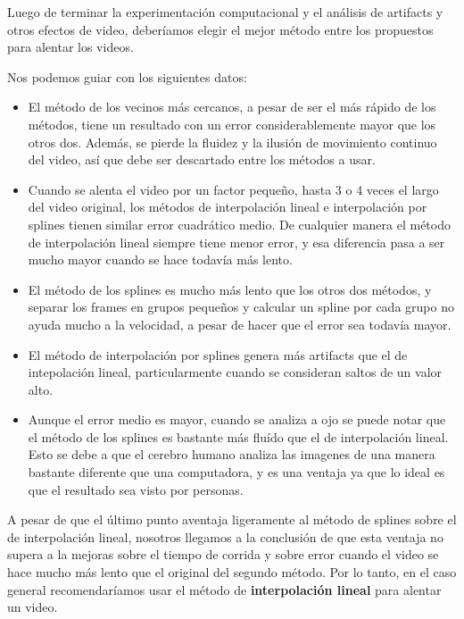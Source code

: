 Luego de terminar la experimentaci\'on computacional y el an\'alisis de artifacts y otros efectos de video, deber\'iamos elegir el mejor m\'etodo entre los propuestos para alentar los videos.

Nos podemos guiar con los siguientes datos:

\vspace{-2ex}

\begin{itemize}
	\item El m\'etodo de los vecinos m\'as cercanos, a pesar de ser el m\'as r\'apido de los m\'etodos, tiene un resultado con un error considerablemente mayor que los otros dos. Adem\'as, se pierde la fluidez y la ilusi\'on de movimiento continuo del video, as\'i que debe ser descartado entre los m\'etodos a usar.
	\item Cuando se alenta el video por un factor peque\~no, hasta 3 o 4 veces el largo del video original, los m\'etodos de interpolaci\'on lineal e interpolaci\'on por splines tienen similar error cuadr\'atico medio. De cualquier manera el m\'etodo de interpolaci\'on lineal siempre tiene menor error, y esa diferencia pasa a ser mucho mayor cuando se hace todav\'ia m\'as lento.
	\item El m\'etodo de los splines es mucho m\'as lento que los otros dos m\'etodos, y separar los frames en grupos peque\~nos y calcular un spline por cada grupo no ayuda mucho a la velocidad, a pesar de hacer que el error sea todav\'ia mayor.
	\item El m\'etodo de interpolaci\'on por splines genera m\'as artifacts que el de intepolaci\'on lineal, particularmente cuando se consideran saltos de un valor alto.
	\item Aunque el error medio es mayor, cuando se analiza a ojo se puede notar que el m\'etodo de los splines es bastante m\'as flu\'ido que el de interpolaci\'on lineal. Esto se debe a que el cerebro humano analiza las imagenes de una manera bastante diferente que una computadora, y es una ventaja ya que lo ideal es que el resultado sea visto por personas.
\end{itemize}

A pesar de que el \'ultimo punto aventaja ligeramente al m\'etodo de splines sobre el de interpolaci\'on lineal, nosotros llegamos a la conclusi\'on de que esta ventaja no supera a la mejoras sobre el tiempo de corrida y sobre error cuando el video se hace mucho m\'as lento que el original del segundo m\'etodo. Por lo tanto, en el caso general recomendar\'iamos usar el m\'etodo de \textbf{interpolaci\'on lineal} para alentar un video.

